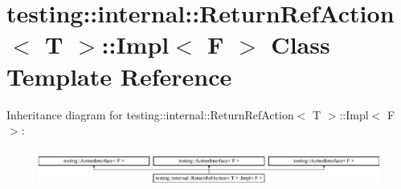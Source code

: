 \hypertarget{classtesting_1_1internal_1_1_return_ref_action_1_1_impl}{}\section{testing\+::internal\+::Return\+Ref\+Action$<$ T $>$\+::Impl$<$ F $>$ Class Template Reference}
\label{classtesting_1_1internal_1_1_return_ref_action_1_1_impl}
Inheritance diagram for testing\+::internal\+::Return\+Ref\+Action$<$ T $>$\+::Impl$<$ F $>$\+:\begin{figure}[H]
\begin{center}
\leavevmode
\includegraphics[height=1.274175cm]{d5/d73/classtesting_1_1internal_1_1_return_ref_action_1_1_impl}
\end{center}
\end{figure}
